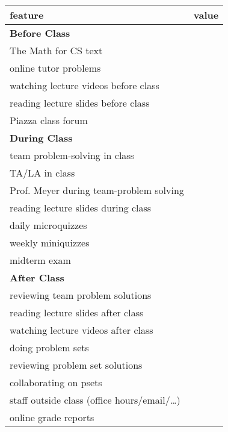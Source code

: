 \documentclass[handout]{mcs}
\begin{document}
\begin{center}

\begin{tabular}{| l | c |}
\hline
\hspace{1in} feature &  value\\  %
\hline  \hline
\textbf{Before Class} \\ \hline \hline
   The Math for CS text          & \\  \hline
   online tutor problems & \\  \hline
   watching lecture videos before class    & \\  \hline
   reading lecture slides before class    & \\  \hline
   Piazza class forum  & \\  \hline
\hline
\textbf{During Class}\\ \hline \hline
   team problem-solving in class  & \\   \hline
   TA/LA in class        & \\  \hline
   Prof. Meyer during team-problem solving &\\ \hline
   reading lecture slides during class    & \\  \hline
   daily microquizzes &\\ \hline
   weekly miniquizzes                & \\  \hline
   midterm exam                   & \\  \hline
\hline
\textbf{After Class}\\ \hline \hline
   reviewing team problem solutions       & \\  \hline
   reading lecture slides after class     & \\  \hline
   watching lecture videos after class     & \\  \hline
   doing problem sets          & \\  \hline
   reviewing problem set solutions & \\  \hline
   collaborating on psets                 & \\  \hline
   staff outside class (office hours/email/\dots) & \\  \hline
   online grade reports                   & \\  \hline
\end{tabular}
\end{center}
\end{document}
